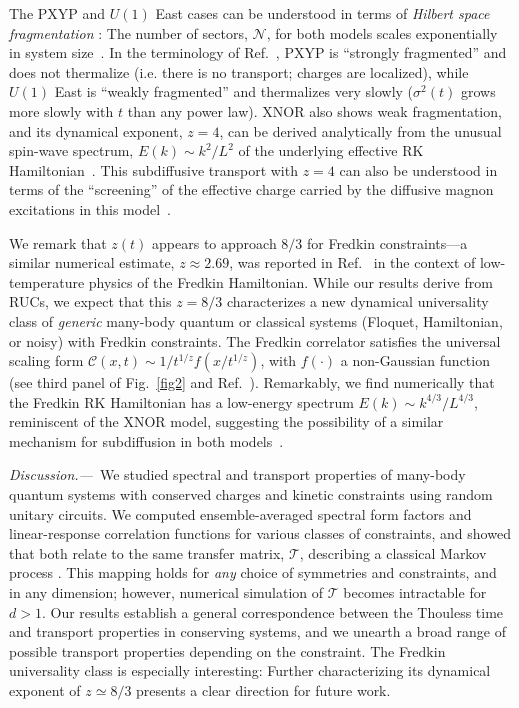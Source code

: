 \documentclass[prl,aps,amsfonts,twocolumn,superscriptaddress,notitlepage,floatfix]{revtex4-1}
\def\Tmat{\mathcal{T}}
\def\Corr{\mathcal{C}}
\def\numsec{\mathcal{N}}
\begin{document}
The PXYP and $U(1)$ East cases can be understood in terms of {\em Hilbert space fragmentation} \cite{RahulFractonCircuit,RahulShattering,PabloFragmentPRX,moudgalya2019thermalization,SLIOM1,kohlert2021experimental,SLIOM1}: The number of sectors, $\numsec$, for both models scales exponentially in system size~\cite{supp}. In the terminology of Ref.~, PXYP is ``strongly fragmented'' and does not thermalize (i.e. there is no transport; charges are localized), while $U(1)$ East is ``weakly fragmented'' and thermalizes very slowly ($\sigma^2(t)$ grows more slowly with $t$ than any power law). XNOR also shows weak fragmentation, and its dynamical exponent, $z=4$, can be derived analytically from the unusual spin-wave spectrum, $E(k) \sim k^2/L^2$ of the underlying effective RK Hamiltonian~\cite{supp}. This subdiffusive transport with $z=4$ can also be understood in terms of the ``screening'' of the effective charge carried by the diffusive magnon excitations in this model~\cite{PhysRevLett.122.127202,supp}.

We remark that $z(t)$ appears to approach $8/3$ for Fredkin constraints---a similar numerical estimate, $z \approx 2.69$, was reported in Ref.~ in the context of low-temperature physics of the Fredkin Hamiltonian. While our results derive from RUCs, we expect that this $z=8/3$ characterizes a new dynamical universality class of \emph{generic} many-body quantum or classical systems (Floquet, Hamiltonian, or noisy) with Fredkin constraints. The Fredkin correlator satisfies the universal scaling form $\Corr(x,t) \sim 1/t^{1/z} f(x/t^{1/z})$, with $f(\cdot)$ a non-Gaussian function (see third panel of Fig.~\ref{fig2} and Ref.~).  Remarkably, we find numerically that the Fredkin RK Hamiltonian has a low-energy spectrum $E(k) \sim k^{4/3}/L^{4/3}$, reminiscent of the XNOR model, suggesting the possibility of a similar mechanism for subdiffusion in both models~\cite{supp}.


\noindent \emph{Discussion.---}\, 
We studied spectral and transport properties of many-body quantum systems with conserved charges and kinetic constraints using random unitary circuits. We computed ensemble-averaged spectral form factors and linear-response correlation functions for various classes of constraints, and showed that both relate to the same transfer matrix, $\Tmat$, describing a classical Markov process%
. This mapping holds for \emph{any} choice of symmetries and constraints, and in any dimension; however, numerical simulation of $\Tmat$ becomes intractable for $d>1$. Our results establish a general correspondence between the Thouless time and transport properties in conserving systems, and we unearth a broad range of possible transport properties depending on the %
constraint. The Fredkin universality class is especially interesting: Further characterizing its dynamical exponent of $z \simeq 8/3$ presents a clear direction for future work. 
\end{document}
